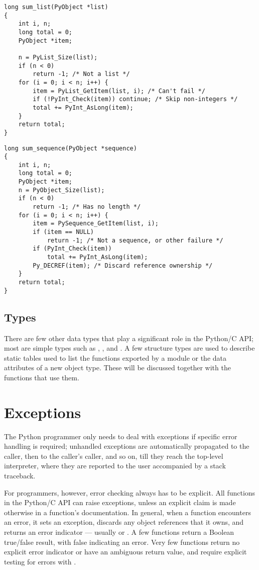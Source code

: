 \documentclass{manual}
\begin{document}
\begin{verbatim}
long sum_list(PyObject *list)
{
    int i, n;
    long total = 0;
    PyObject *item;

    n = PyList_Size(list);
    if (n < 0)
        return -1; /* Not a list */
    for (i = 0; i < n; i++) {
        item = PyList_GetItem(list, i); /* Can't fail */
        if (!PyInt_Check(item)) continue; /* Skip non-integers */
        total += PyInt_AsLong(item);
    }
    return total;
}
\end{verbatim}

\begin{verbatim}
long sum_sequence(PyObject *sequence)
{
    int i, n;
    long total = 0;
    PyObject *item;
    n = PyObject_Size(list);
    if (n < 0)
        return -1; /* Has no length */
    for (i = 0; i < n; i++) {
        item = PySequence_GetItem(list, i);
        if (item == NULL)
            return -1; /* Not a sequence, or other failure */
        if (PyInt_Check(item))
            total += PyInt_AsLong(item);
        Py_DECREF(item); /* Discard reference ownership */
    }
    return total;
}
\end{verbatim}


\subsection{Types \label{types}}

There are few other data types that play a significant role in 
the Python/C API; most are simple \C{} types such as , 
,  and .  A few structure types 
are used to describe static tables used to list the functions exported 
by a module or the data attributes of a new object type.  These will 
be discussed together with the functions that use them.


\section{Exceptions \label{exceptions}}

The Python programmer only needs to deal with exceptions if specific 
error handling is required; unhandled exceptions are automatically 
propagated to the caller, then to the caller's caller, and so on, till 
they reach the top-level interpreter, where they are reported to the 
user accompanied by a stack traceback.

For \C{} programmers, however, error checking always has to be explicit.  
All functions in the Python/C API can raise exceptions, unless an 
explicit claim is made otherwise in a function's documentation.  In 
general, when a function encounters an error, it sets an exception, 
discards any object references that it owns, and returns an 
error indicator --- usually \NULL{} or .  A few functions 
return a Boolean true/false result, with false indicating an error.
Very few functions return no explicit error indicator or have an 
ambiguous return value, and require explicit testing for errors with 
.
\end{document}
